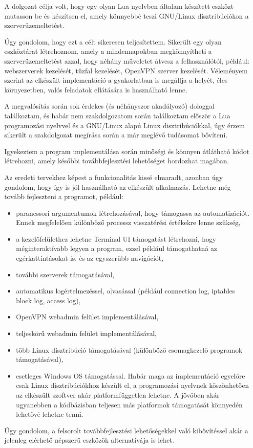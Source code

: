 
A dolgozat célja volt, hogy egy olyan Lua nyelvben általam készített eszközt mutasson be és készítsen el, amely könnyebbé teszi GNU/Linux disztribúciókon a szerverüzemeltetést.

Úgy gondolom, hogy ezt a célt sikeresen teljesítettem. Sikerült egy olyan eszköztárat létrehoznom, amely a mindennapokban megkönnyítheti a szerverüzemeltetést azzal, hogy néhány műveletet átvesz a felhasználótól, például: webszerverek kezelését, tűzfal kezelését, OpenVPN szerver kezelését. Véleményem szerint az elkészült implementáció a gyakorlatban is megállja a helyét, éles környezetben, valós feladatok ellátására is használható lenne.

A megvalósítás során sok érdekes (és néhányszor akadályozó) dologgal találkoztam, és habár nem szakdolgozatom során találkoztam először a Lua programozási nyelvvel és a GNU/Linux alapú Linux disztribúciókkal, úgy érzem sikerült a szakdolgozat megírása során a már meglévő tudásomat bővíteni.

Igyekeztem a program implementálása során minőségi és könnyen átlátható kódot létrehozni, amely későbbi továbbfejlesztési lehetőséget hordozhat magában.

Az eredeti tervekhez képest a funkcionalitás kissé elmaradt, azonban úgy gondolom, hogy így is jól használható az elkészült alkalmazás. Lehetne még tovább fejleszteni a programot, például:
\begin{itemize}
	\item parancssori argumentumok létrehozásával, hogy támogassa az automatizációt. Ennek megfelelően különböző processz visszatérési értékekre lenne szükség,
	\item a kezelőfelülethez lehetne Terminal UI támogatást létrehozni, hogy méginteraktívabb legyen a program, ezzel például támogathatná az egérkattintásokat is, és az egyszerűbb navigációt,
	\item további szerverek támogatásával,
	\item automatikus logértelmezéssel, olvasással (például connection log, iptables block log, access log),
	\item OpenVPN webadmin felület implementálásával,
	\item teljeskörű webadmin felület implementálásával,
	\item több Linux disztribúció támogatásával (különböző csomagkezelő programok támogatásával),
	\item esetleges Windows OS támogatással. Habár maga az implementáció egyelőre csak Linux disztribúciókhoz készült el, a programozási nyelvnek köszönhetően az elkészült szoftver akár platformfüggetlen lehetne. A jövőben akár ugyanebben a kódbázisban teljesen más platformok támogatását könnyedén lehetővé lehetne tenni.
\end{itemize}

Úgy gondolom, a felsorolt továbbfejlesztési lehetőségekkel való kibővítéssel akár a jelenleg elérhető népszerű eszközök alternatívája is lehet.